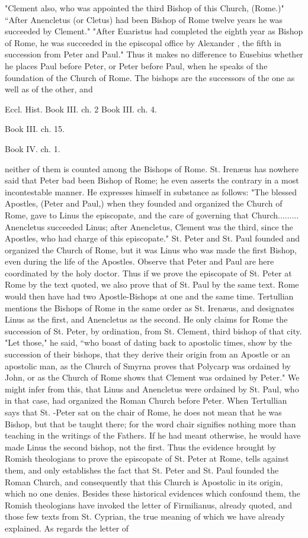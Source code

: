 "Clement also, who was appointed the third Bishop of this Church, (Rome.)" “After Anencletus (or Cletus) had been Bishop of Rome twelve years he was succeeded by Clement." "After Euaristus had completed the eighth year as Bishop of Rome, he was succeeded in the episcopal office by Alexander , the fifth in succession from Peter and Paul." Thus it makes no difference to Eusebius whether he places Paul before Peter, or Peter before Paul, when he speaks of the foundation of the Church of Rome. The bishops are the successors of the one as well as of the other, and

Eccl. Hist. Book III. ch. 2 Book III. ch. 4.

Book III. ch. 15.

Book IV. ch. 1.

neither of them is counted among the Bishops of Rome. St. Irenæus has nowhere said that Peter bad been Bishop of Rome; he even asserts the contrary in a most incontestable manner. He expresses himself in substance as follows: "The blessed Apostles, (Peter and Paul,) when they founded and organized the Church of Rome, gave to Linus the episcopate, and the care of governing that Church......... Anencletus succeeded Linus; after Anencletus, Clement was the third, since the Apostles, who had charge of this episcopate." St. Peter and St. Paul founded and organized the Church of Rome, but it was Linus who was made the first Bishop, even during the life of the Apostles. Observe that Peter and Paul are here coordinated by the holy doctor. Thus if we prove the episcopate of St. Peter at Rome by the text quoted, we also prove that of St. Paul by the same text. Rome would then have had two Apostle-Bishops at one and the same time. Tertullian mentions the Bishops of Rome in the same order as St. Irenæus, and designates Linus as the first, and Anencletus as the second. He only claims for Rome the succession of St. Peter, by ordination, from St. Clement, third bishop of that city. "Let those," he said, “who boast of dating back to apostolic times, show by the succession of their bishops, that they derive their origin from an Apostle or an apostolic man, as the Church of Smyrna proves that Polycarp was ordained by John, or as the Church of Rome shows that Clement was ordained by Peter." We might infer from this, that Linus and Anencletus were ordained by St. Paul, who in that case, had organized the Roman Church before Peter. When Tertullian says that St. -Peter sat on the chair of Rome, he does not mean that he was Bishop, but that be taught there; for the word chair signifies nothing more than teaching in the writings of the Fathers. If he had meant otherwise, he would have made Linus the second bishop, not the first. Thus the evidence brought by Romish theologians to prove the episcopate of St. Peter at Rome, tells against them, and only establishes the fact that St. Peter and St. Paul founded the Roman Church, and consequently that this Church is Apostolic in its origin, which no one denies. Besides these historical evidences which confound them, the Romish theologians have invoked the letter of Firmilianus, already quoted, and those few texts from St. Cyprian, the true meaning of which we have already explained. As regards the letter of 